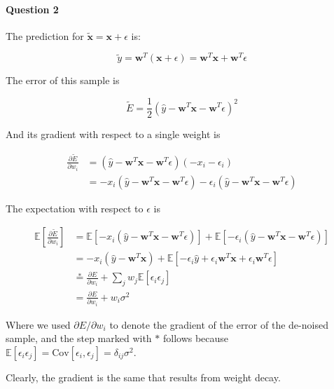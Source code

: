 \documentclass[
  a4paper,
]{article}
\begin{document}
\hypertarget{question-2}{%
\paragraph{Question 2}\label{question-2}}

The prediction for \(\tilde{\textbf{x}}=\textbf{x}+\epsilon\) is:

\[
\tilde{y}=\textbf{w}^T\left(\textbf{x}+\epsilon\right)=\textbf{w}^T\textbf{x}+\textbf{w}^T\epsilon
\]

The error of this sample is

\[
\tilde{E}=\frac 1 2 \left(\hat{y}-\textbf{w}^T\textbf{x}-\textbf{w}^T\epsilon\right)^2
\]

And its gradient with respect to a single weight is

\begin{align*}
\frac{\partial\tilde{E}}{\partial w_i}
&=\left(\hat{y}-\textbf{w}^T\textbf{x}-\textbf{w}^T\epsilon\right)(-x_i-\epsilon_i) \\
&=-x_i\left(\hat{y}-\textbf{w}^T\textbf{x}-\textbf{w}^T\epsilon\right)-\epsilon_i\left(\hat{y}-\textbf{w}^T\textbf{x}-\textbf{w}^T\epsilon\right)
\end{align*}

The expectation with respect to \(\epsilon\) is

\begin{align*}
\mathbb{E}\left[\frac{\partial\tilde{E}}{\partial w_i}\right]
&=\mathbb{E}\left[
-x_i\left(\hat{y}-\textbf{w}^T\textbf{x}-\textbf{w}^T\epsilon\right)
\right]+\mathbb{E}\left[
-\epsilon_i\left(\hat{y}-\textbf{w}^T\textbf{x}-\textbf{w}^T\epsilon\right)
\right] \\
&= -x_i\left(\hat{y}-\textbf{w}^T\textbf{x}\right)+\mathbb{E}\left[
-\epsilon_i\hat{y}+\epsilon_i\textbf{w}^T\textbf{x}+\epsilon_i\textbf{w}^T\epsilon
\right] \\
&\stackrel{*}{=} \frac{\partial E}{\partial w_i}+\sum_j w_j\mathbb{E}\left[\epsilon_i\epsilon_j\right] \\
&= \frac{\partial E}{\partial w_i}+w_i\sigma^2    
\end{align*}

Where we used \(\partial E/\partial w_i\) to denote the gradient of the
error of the de-noised sample, and the step marked with \(*\) follows
because
\(\mathbb{E}[\epsilon_i\epsilon_j]=\text{Cov}\left[\epsilon_i, \epsilon_j\right]=\delta_{ij}\sigma^2\).

Clearly, the gradient is the same that results from weight decay.
\end{document}
